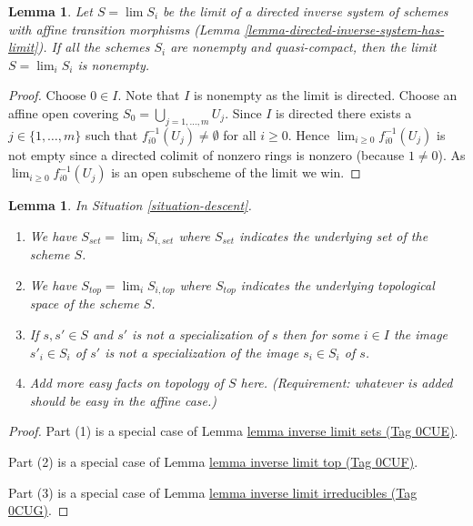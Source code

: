 \documentclass{amsart}
\theoremstyle{plain}
\newtheorem{lemma}[subsection]{Lemma}
\theoremstyle{definition}
\theoremstyle{remark}
\numberwithin{equation}{subsection}
\def\lim{\mathop{\mathrm{lim}}\nolimits}
\begin{document}
\begin{lemma}
\label{lemma-limit-nonempty}
Let $S = \lim S_i$ be the limit of a directed inverse system
of schemes with affine transition morphisms
(Lemma \ref{lemma-directed-inverse-system-has-limit}).
If all the schemes $S_i$ are nonempty and quasi-compact,
then the limit $S = \lim_i S_i$ is nonempty.
\end{lemma}

\begin{proof}
Choose $0 \in I$. Note that $I$ is nonempty as the limit is directed.
Choose an affine open covering $S_0 = \bigcup_{j = 1, \ldots, m} U_j$.
Since $I$ is directed there exists a $j \in \{1, \ldots, m\}$
such that $f_{i0}^{-1}(U_j) \not = \emptyset$ for all
$i \geq 0$. Hence $\lim_{i \geq 0} f_{i0}^{-1}(U_j)$ is not
empty since a directed colimit of nonzero rings is nonzero
(because $1 \not = 0$). As $\lim_{i \geq 0} f_{i0}^{-1}(U_j)$
is an open subscheme of the limit we win.
\end{proof}


\begin{lemma}
\label{lemma-topology-limit}
In Situation \ref{situation-descent}.
\begin{enumerate}
\item We have $S_{set} = \lim_i S_{i, set}$ where $S_{set}$
indicates the underlying set of the scheme $S$.
\item We have $S_{top} = \lim_i S_{i, top}$ where $S_{top}$
indicates the underlying topological space of the scheme $S$.
\item If $s, s' \in S$ and $s'$ is not a specialization of $s$
then for some $i \in I$ the image $s'_i \in S_i$ of $s'$ is not
a specialization of the image $s_i \in S_i$ of $s$.
\item Add more easy facts on topology of $S$ here.
(Requirement: whatever is added should be easy in the affine case.)
\end{enumerate}
\end{lemma}

\begin{proof}
Part (1) is a special case of Lemma \href{https://stacks.math.columbia.edu/tag/0CUE}{lemma inverse limit sets (Tag 0CUE)}.

\medskip\noindent
Part (2) is a special case of Lemma \href{https://stacks.math.columbia.edu/tag/0CUF}{lemma inverse limit top (Tag 0CUF)}.

\medskip\noindent
Part (3) is a special case of Lemma \href{https://stacks.math.columbia.edu/tag/0CUG}{lemma inverse limit irreducibles (Tag 0CUG)}.
\end{proof}
\end{document}
